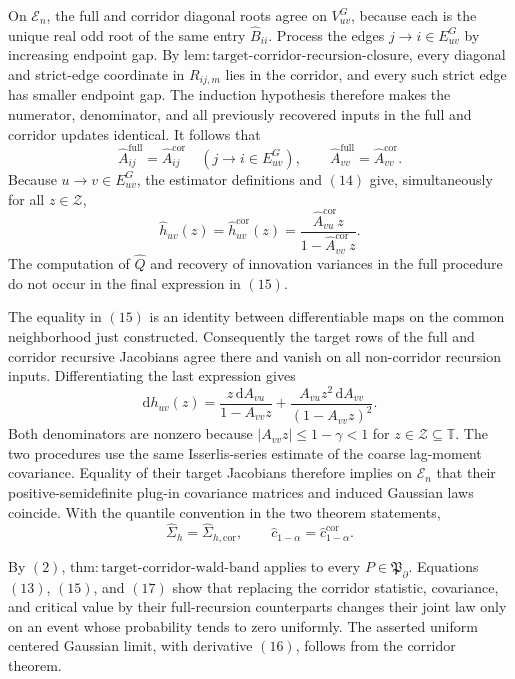 On \(\mathcal E_n\), the full and corridor diagonal roots agree on
\(V_{uv}^{G}\), because each is the unique real odd root of the same
entry \(\widehat B_{ii}\).  Process the edges \(j\to i\in E_{uv}^{G}\)
by increasing endpoint gap.  By
\(\mathrm{lem{:}target\mbox{-}corridor\mbox{-}recursion\mbox{-}closure}\),
every diagonal and strict-edge coordinate in \(R_{ij,m}\) lies in the
corridor, and every such strict edge has smaller endpoint gap.  The
induction hypothesis therefore makes the numerator, denominator, and all
previously recovered inputs in the full and corridor updates identical.
It follows that
\[
 \widehat A_{ij}^{\mathrm{full}}
 =\widehat A_{ij}^{\mathrm{cor}}
 \quad(j\to i\in E_{uv}^{G}),
 \qquad
 \widehat A_{vv}^{\mathrm{full}}=
 \widehat A_{vv}^{\mathrm{cor}}.
 \tag{14}
\]
Because \(u\to v\in E_{uv}^{G}\), the estimator definitions and \((14)\)
give, simultaneously for all \(z\in\mathcal Z\),
\[
 \widehat h_{uv}(z)
 =\widehat h_{uv}^{\mathrm{cor}}(z)
 =\frac{\widehat A_{vu}^{\mathrm{cor}}z}
 {1-\widehat A_{vv}^{\mathrm{cor}}z}.
 \tag{15}
\]
The computation of \(\widehat Q\) and recovery of innovation variances in
the full procedure do not occur in the final expression in \((15)\).

The equality in \((15)\) is an identity between differentiable maps on
the common neighborhood just constructed.  Consequently the target rows
of the full and corridor recursive Jacobians agree there and vanish on
all non-corridor recursion inputs.  Differentiating the last expression
gives
\[
 \mathrm dh_{uv}(z)
 =\frac{z\,\mathrm dA_{vu}}{1-A_{vv}z}
  +\frac{A_{vu}z^2\,\mathrm dA_{vv}}{(1-A_{vv}z)^2}.
 \tag{16}
\]
Both denominators are nonzero because \(|A_{vv}z|\leq1-\gamma<1\) for
\(z\in\mathcal Z\subseteq\mathbb T\).  The two procedures use the same
Isserlis-series estimate of the coarse lag-moment covariance.  Equality
of their target Jacobians therefore implies on \(\mathcal E_n\) that
their positive-semidefinite plug-in covariance matrices and induced
Gaussian laws coincide.  With the quantile convention in the two theorem
statements,
\[
 \widehat\Sigma_h=\widehat\Sigma_{h,\mathrm{cor}},
 \qquad
 \widehat c_{1-\alpha}
 =\widehat c_{1-\alpha}^{\mathrm{cor}}.
 \tag{17}
\]

By \((2)\),
\(\mathrm{thm{:}target\mbox{-}corridor\mbox{-}wald\mbox{-}band}\)
applies to every \(P\in\mathfrak P_{\partial}\).  Equations
\((13)\), \((15)\), and \((17)\) show that replacing the corridor
statistic, covariance, and critical value by their full-recursion
counterparts changes their joint law only on an event whose probability
tends to zero uniformly.  The asserted uniform centered Gaussian limit,
with derivative \((16)\), follows from the corridor theorem.


